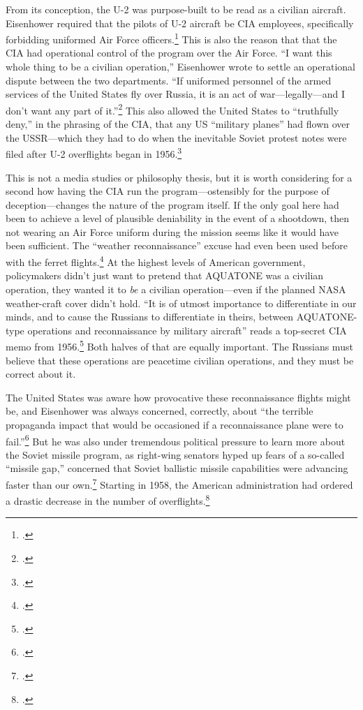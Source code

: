 \documentclass{report}
\begin{document}
\begin{refsegment}
From its conception, the U-2 was purpose-built to be read as a civilian aircraft. Eisenhower required that the pilots of U-2 aircraft be CIA employees, specifically forbidding uniformed Air Force officers.\footcite[p.~33, Though many of the pilots did have Air Force backgrounds.]{lindgren_trust_2000} This is also the reason that that the CIA had operational control of the program over the Air Force. ``I want this whole thing to be a civilian operation,'' Eisenhower wrote to settle an operational dispute between the two departments. ``If uniformed personnel of the armed services of the United States fly over Russia, it is an act of war---legally---and I don't want any part of it.''\footcite[p.~60. The original source for this quote is an \emph{OSA History} that requires codeword clearance. It is quoted here by the History Staff of the CIA.]{pedlow_cia_1998} This also allowed the United States to ``truthfully deny,'' in the phrasing of the CIA, that any US ``military planes'' had flown over the USSR---which they had to do when the inevitable Soviet protest notes were filed after U-2 overflights began in 1956.\footcite[p.~109]{pedlow_cia_1998}

This is not a media studies or philosophy thesis, but it is worth considering for a second how having the CIA run the program---ostensibly for the purpose of deception---changes the nature of the program itself. If the only goal here had been to achieve a level of plausible deniability in the event of a shootdown, then not wearing an Air Force uniform during the mission seems like it would have been sufficient. The ``weather reconnaissance'' excuse had even been used before with the ferret flights.\footcite[p.~45]{farquhar_aerial_2015} At the highest levels of American government, policymakers didn't just want to pretend that AQUATONE was a civilian operation, they wanted it to \emph{be} a civilian operation---even if the planned NASA weather-craft cover didn't hold. ``It is of utmost importance to differentiate in our minds, and to cause the Russians to differentiate in theirs, between AQUATONE-type operations and reconnaissance by military aircraft'' reads a top-secret CIA memo from 1956.\footcite[p.~1]{miller_suggestions_1956} Both halves of that are equally important. The Russians must believe that these operations are peacetime civilian operations, and they must be correct about it.

The United States was aware how provocative these reconnaissance flights might be, and Eisenhower was always concerned, correctly, about ``the terrible propaganda impact that would be occasioned if a reconnaissance plane were to fail.''\footcite[p.~162]{pedlow_cia_1998} But he was also under tremendous political pressure to learn more about the Soviet missile program, as right-wing senators hyped up fears of a so-called ``missile gap,'' concerned that Soviet ballistic missile capabilities were advancing faster than our own.\footcite[Fears of this missile gap quickly followed earlier fears of a ``bomber gap,'' which ironically the U-2 had been critical in disproving.]{licklider_missile_1970} Starting in 1958, the American administration had ordered a drastic decrease in the number of overflights.\footcite[p.~51]{powers_operation_2004}


\end{refsegment}
\end{document}
